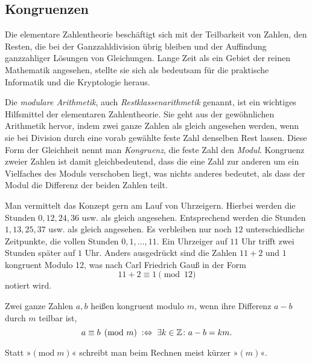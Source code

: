 \subsection{Kongruenzen}

Die elementare Zahlentheorie beschäftigt sich mit der Teilbarkeit von
Zahlen, den Resten, die bei der Ganzzahldivision übrig bleiben
und der Auffindung ganzzahliger Lösungen von Gleichungen. Lange Zeit
als ein Gebiet der reinen Mathematik angesehen, stellte sie sich
als bedeutsam für die praktische Informatik und die Kryptologie heraus. 

Die \emph{modulare Arithmetik}, auch \emph{Restklassenarithmetik}
genannt, ist ein wichtiges Hilfsmittel der elementaren Zahlentheorie.
Sie geht aus der gewöhnlichen Arithmetik hervor, indem zwei ganze
Zahlen als gleich angesehen werden, wenn sie bei Division durch eine
vorab gewählte feste Zahl denselben Rest lassen. Diese Form der
Gleichheit nennt man \emph{Kongruenz}, die feste Zahl den \emph{Modul}.
Kongruenz zweier Zahlen ist damit gleichbedeutend, dass die eine
Zahl zur anderen um ein Vielfaches des Moduls verschoben liegt, was nichts
anderes bedeutet, als dass der Modul die Differenz der beiden Zahlen teilt.

Man vermittelt das Konzept gern am Lauf von Uhrzeigern. Hierbei werden
die Stunden $0, 12, 24, 36$ usw. als gleich angesehen. Entsprechend
werden die Stunden $1, 13, 25, 37$ usw. als gleich angesehen. Es
verbleiben nur noch $12$ unterschiedliche Zeitpunkte, die vollen
Stunden $0, 1, \ldots, 11$. Ein Uhrzeiger auf $11$ Uhr trifft
zwei Stunden später auf $1$ Uhr. Anders ausgedrückt sind die Zahlen
$11+2$ und $1$ kongruent Modulo 12, was nach Carl Friedrich Gauß
in der Form
\[11 + 2\equiv 1\pmod{12}\]
notiert wird.

\begin{Definition}[Kongruenz]\newlinefirst
Zwei ganze Zahlen $a,b$ heißen kongruent modulo $m$, wenn ihre Differenz
$a-b$ durch $m$ teilbar ist,%
\[a\equiv b\pmod{m}\;:\Leftrightarrow\;\exists k\in\mathbb Z\colon a-b=km.\]
\end{Definition}
Statt »$(\mathrm{mod}\;m)$« schreibt man beim Rechnen meist
kürzer »$(m)$«.

